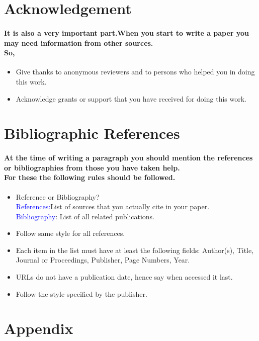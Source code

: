 \documentclass[20pt]{report}
\begin{document}
\section{Acknowledgement}
\paragraph{It is also a very important part.When you start to write a paper you may need information from other sources.\\So,}
\begin{itemize}
\item Give thanks to anonymous reviewers and to persons who
helped you in doing this work.
\item Acknowledge grants or support that you have received for
doing this work.
\end{itemize}

\section{Bibliographic References}
\paragraph{At the time of writing a paragraph you should mention the references or bibliographies from those you have taken help.\\For these the following rules should be followed.}
\begin{itemize}
\item Reference or Bibliography?\\
 \textcolor {blue} {References:}List of sources that you actually cite in your
paper.\\
\textcolor {blue} {Bibliography}: List of all related publications.
\item Follow same style for all references.
\item Each item in the list must have at least the following fields:
Author(s), Title, Journal or Proceedings, Publisher, Page
Numbers, Year.
\item URLs do not have a publication date, hence say when
accessed it last.
\item Follow the style specified by the publisher.
\end{itemize}

\section{Appendix}
\end{document}
